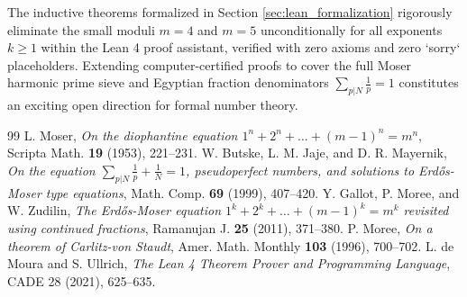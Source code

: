 \documentclass[11pt,a4paper]{article}
\theoremstyle{definition}
\begin{document}
The inductive theorems formalized in Section \ref{sec:lean_formalization} rigorously eliminate the small moduli $m=4$ and $m=5$ unconditionally for all exponents $k \ge 1$ within the Lean 4 proof assistant, verified with zero axioms and zero `sorry` placeholders. Extending computer-certified proofs to cover the full Moser harmonic prime sieve and Egyptian fraction denominators $\sum_{p|N} \frac{1}{p} = 1$ constitutes an exciting open direction for formal number theory.

\begin{thebibliography}{99}
 L. Moser, \textit{On the diophantine equation $1^n + 2^n + \dots + (m-1)^n = m^n$}, Scripta Math. \textbf{19} (1953), 221--231.
 W. Butske, L. M. Jaje, and D. R. Mayernik, \textit{On the equation $\sum_{p|N} \frac{1}{p} + \frac{1}{N} = 1$, pseudoperfect numbers, and solutions to Erd\H{o}s-Moser type equations}, Math. Comp. \textbf{69} (1999), 407--420.
 Y. Gallot, P. Moree, and W. Zudilin, \textit{The Erd\H{o}s-Moser equation $1^k + 2^k + \dots + (m-1)^k = m^k$ revisited using continued fractions}, Ramanujan J. \textbf{25} (2011), 371--380.
 P. Moree, \textit{On a theorem of Carlitz-von Staudt}, Amer. Math. Monthly \textbf{103} (1996), 700--702.
 L. de Moura and S. Ullrich, \textit{The Lean 4 Theorem Prover and Programming Language}, CADE 28 (2021), 625--635.
\end{thebibliography}
\end{document}
